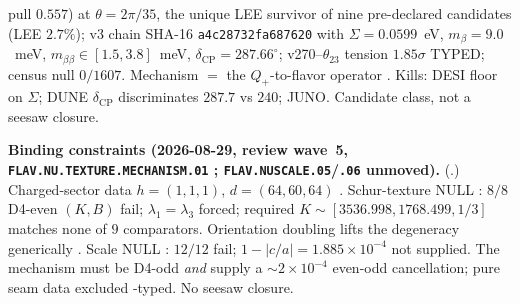 \documentclass[11pt,a4paper]{article}
\theoremstyle{definition}
\begin{document}
pull $0.557$) at $\theta=2\pi/35$, the unique LEE survivor of nine pre-declared candidates
(LEE $2.7\%$); v3 chain SHA-16 \texttt{a4c28732fa687620} with $\Sigma=0.0599$~eV,
$m_\beta=9.0$~meV, $m_{\beta\beta}\in[1.5,3.8]$~meV, $\delta_{\mathrm{CP}}=287.66^\circ$;
v270--$\theta_{23}$ tension $1.85\sigma$ TYPED; census null $0/1607$.
Mechanism $=$ the $Q_+$-to-flavor operator \mO.
Kills: DESI floor on $\Sigma$; DUNE $\delta_{\mathrm{CP}}$ discriminates $287.7$ vs $240$;
JUNO.  Candidate class, not a seesaw closure.
\par\smallskip\noindent\textbf{Binding constraints (2026-08-29, review wave~5,
\texttt{FLAV.NU.TEXTURE.MECHANISM.01} \mO; \texttt{FLAV.NUSCALE.05}/\texttt{.06} unmoved).}
(.)
Charged-sector data $h=(1,1,1)$, $d=(64,60,64)$ \mE.  Schur-texture NULL \mX: $8/8$ D4-even
$(K,B)$ fail; $\lambda_1=\lambda_3$ forced; required $K\sim[3536.998,1768.499,1/3]$ matches none
of $9$ comparators.  Orientation doubling lifts the degeneracy generically \mE.  Scale NULL
\mX: $12/12$ fail; $1-\lvert c/a\rvert=1.885{\times}10^{-4}$ not supplied.  The mechanism must
be D4-odd \emph{and} supply a $\sim2{\times}10^{-4}$ even-odd cancellation; pure seam data
excluded \mX-typed.  No seesaw closure.

\end{document}
